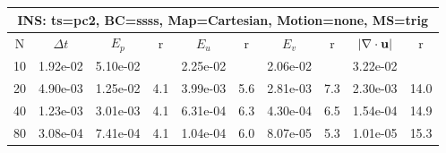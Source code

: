 
\begin{tabular}{|c|c|c|c|c|c|c|c|c|c|} \hline
 \multicolumn{10}{|c|}{INS: ts=pc2, BC=ssss, Map=Cartesian, Motion=none, MS=trig } \\ \hline 
     N  &   $\Delta t$ & $E_p$   &  r  &   $E_u$   &   r    &   $E_v$   & r   &  $|\nabla\cdot\mathbf{ u}|$  & r   \\ \hline 
  10   &  1.92e-02  &   5.10e-02  &        &   2.25e-02  &        &   2.06e-02  &        &   3.22e-02  &        \\ 
  20   &  4.90e-03  &   1.25e-02  & 4.1  &   3.99e-03  & 5.6  &   2.81e-03  & 7.3  &   2.30e-03  & 14.0  \\ 
  40   &  1.23e-03  &   3.01e-03  & 4.1  &   6.31e-04  & 6.3  &   4.30e-04  & 6.5  &   1.54e-04  & 14.9  \\ 
  80   &  3.08e-04  &   7.41e-04  & 4.1  &   1.04e-04  & 6.0  &   8.07e-05  & 5.3  &   1.01e-05  & 15.3  \\ 
 \hline 
\end{tabular}
